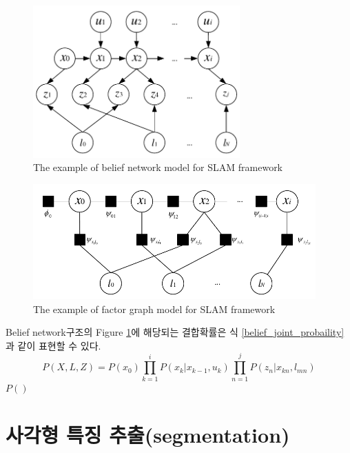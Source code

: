 \documentclass[master,korean,final]{cbnu-ecs}
\begin{document}
\newpage
\begin{figure}[!ht]
  \centering
	\includegraphics[width=300px]{img/beliefnetwork_cropped.pdf}
  \caption{The example of belief network model for SLAM framework}
\label{belief_network}
\end{figure}

\begin{figure}[!ht]
  \centering
	\includegraphics[width=410px]{img/factorgraph_cropped.pdf}
  \caption{The example of factor graph model for SLAM framework}
\label{factorgraph_diagram}
\end{figure}
\newpage

Belief network구조의 Figure \ref{belief_network}에 해당되는 결합확률은 식 \eqref{belief_joint_probaility}과 같이 표현할 수 있다.
\begin{equation}
\label{belief_joint_probaility}
P(X, L, Z)=P(x_0)\prod^i_{k=1}P(x_k|x_{k-1}, u_k)\prod^j_{n=1}P(z_n|x_{kn}, l_{mn})
\end{equation}
$P()$

\chapter{사각형 특징 추출(segmentation)}
\cite{Zhang2003}%
\cite{Han2009}%
\cite{Wildenauer2008}%
\cite{Jung2004}%
\cite{Bazin2007}%
\cite{Bhaskar2010}%
\end{document}
